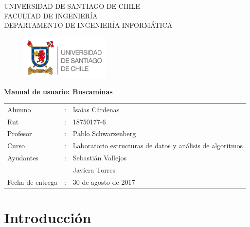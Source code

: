 \documentclass[letterpaper,12pt]{report}
\begin{document}
\renewcommand{\contentsname}{Tabla de Contenido}
\begin{titlepage}
\begin{center}
UNIVERSIDAD DE SANTIAGO DE CHILE\\
FACULTAD DE INGENIERÍA\\
DEPARTAMENTO DE INGENIERÍA INFORMÁTICA\\
\begin{figure}[htb]
\begin{center}
\includegraphics[width=4.5cm]{logo.png}
\end{center}
\end{figure}

\vspace*{0.7in}
\begin{Large}
\textbf{Manual de usuario: Buscaminas} \\
\end{Large}
\vspace*{0.3in}

\vspace*{2in}

\end{center}
\begin{flushright}

\begin{tabular}{lll}
Alumno & : & Isaías Cárdenas\\
Rut & : & 18750177-6\\
Profesor & : & Pablo Schwarzenberg\\
Curso & : & Laboratorio estructuras de datos y análisis de algoritmos\\
Ayudantes & : & Sebastián Vallejos\\
          &  & Javiera Torres\\
Fecha de entrega & : & 30 de agosto de 2017
\end{tabular}
\end{flushright}
\end{titlepage}

\tableofcontents

\chapter {Introducci\'on}
\end{document}

